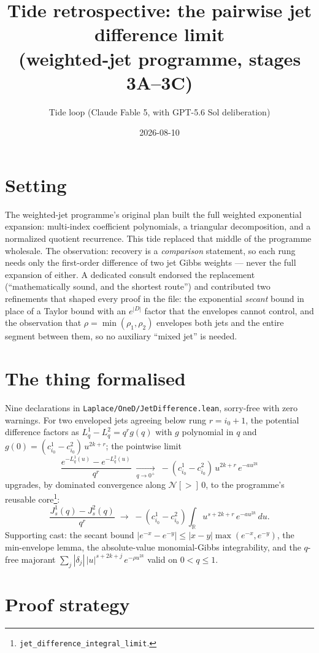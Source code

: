 \documentclass[11pt]{article}
\title{Tide retrospective: the pairwise jet difference limit\\
(weighted-jet programme, stages 3A--3C)}
\author{Tide loop (Claude Fable 5, with GPT-5.6 Sol deliberation)}
\date{2026-08-10}
\begin{document}
\maketitle

\section{Setting}

The weighted-jet programme's original plan built the full weighted
exponential expansion: multi-index coefficient polynomials, a
triangular decomposition, and a normalized quotient recurrence. This
tide replaced that middle of the programme wholesale. The observation:
recovery is a \emph{comparison} statement, so each rung needs only
the first-order difference of two jet Gibbs weights --- never the
full expansion of either. A dedicated consult endorsed the
replacement (``mathematically sound, and the shortest route'') and
contributed two refinements that shaped every proof in the file: the
exponential \emph{secant} bound in place of a Taylor bound with an
$e^{|D|}$ factor that the envelopes cannot control, and the
observation that $\rho = \min(\rho_1, \rho_2)$ envelopes both jets
and the entire segment between them, so no auxiliary ``mixed jet'' is
needed.

\section{The thing formalised}

Nine declarations in \texttt{Laplace/OneD/JetDifference.lean},
sorry-free with zero warnings. For two enveloped jets agreeing below
rung $r = i_0 + 1$, the potential difference factors as
$L^1_q - L^2_q = q^r g(q)$ with $g$ polynomial in $q$ and
$g(0) = (c^1_{i_0} - c^2_{i_0})\,u^{2k+r}$; the pointwise limit
\[
\frac{e^{-L^1_q(u)} - e^{-L^2_q(u)}}{q^r}
\;\xrightarrow[q \to 0^+]{}\;
-(c^1_{i_0} - c^2_{i_0})\,u^{2k+r}\,e^{-a u^{2k}}
\]
upgrades, by dominated convergence along $\mathcal{N}[>]\,0$, to the
programme's reusable core\footnote{\texttt{jet\_difference\_integral\_limit}.}:
\[
\frac{J^1_s(q) - J^2_s(q)}{q^r}
\;\longrightarrow\;
-(c^1_{i_0} - c^2_{i_0})
\int_{\mathbb{R}} u^{s+2k+r}\, e^{-a u^{2k}}\,du .
\]
Supporting cast: the secant bound
$|e^{-x} - e^{-y}| \le |x - y| \max(e^{-x}, e^{-y})$, the
min-envelope lemma, the absolute-value monomial-Gibbs integrability,
and the $q$-free majorant
$\sum_j |\delta_j|\,|u|^{s+2k+j}\,e^{-\rho u^{2k}}$ valid on
$0 < q \le 1$.

\section{Proof strategy}
\end{document}
